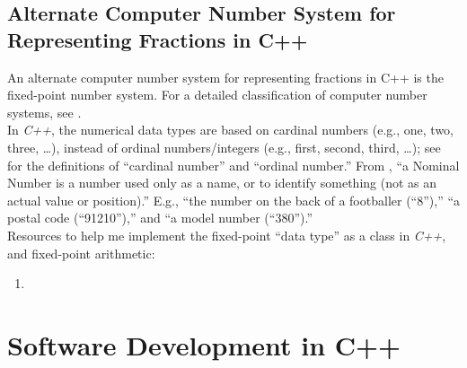 \subsection{Alternate Computer Number System for Representing Fractions in C++}
\label{ssec:AlternateComputerNumberSystemforRepresentingFractionsInCpp}

	An alternate computer number system for representing fractions in C++ is the fixed-point number system. For a detailed classification of computer number systems, see \cite{Lu2004}. \\

	In {\it C++}, the numerical data types are based on cardinal numbers (e.g., one, two, three, \dots), instead of ordinal numbers/integers (e.g., first, second, third, \dots); see \cite{DictionaryDotComStaff2016,WolframResearchStaff2016,Pierce2016} for the definitions of ``cardinal number'' and ``ordinal number.'' From \cite{Pierce2016}, ``a Nominal Number is a number used only as a name, or to identify something (not as an actual value or position).'' E.g., ``the number on the back of a footballer (``8''),'' ``a postal code (``91210''),'' and ``a model number (``380'').'' \\




Resources to help me implement the fixed-point ``data type'' as a class in {\it C++}, and fixed-point arithmetic: \vspace{-0.3cm}
\begin{enumerate} \itemsep -4pt
\item 
\end{enumerate}



\section{Software Development in C++}
\label{sec:SoftwareDevelopmentInCpp}


